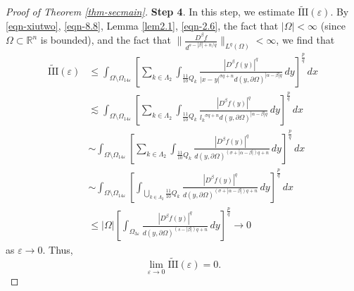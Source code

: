 \documentclass[11pt,twoside]{article}
\def\Qk{\frac{11}{10}Q_k}
\def\az{\alpha}
\def\bz{\beta}
\def\boz{{\Omega}}
\def\sz{\sigma}
\def\vez{\varepsilon}
\def\pa{\partial}                %
\def\huae{\varepsilon}
\def\bozthreee{\boz_{3\huae}}
\theoremstyle{mylem}
\theoremstyle{definition}
\numberwithin{equation}{section}
\begin{document}
\begin{proof}[Proof of Theorem \ref{thm-secmain}]
{\bf Step 4}. In this step, we estimate \(\tilde{\mathrm{III}}(\vez)\). By \eqref{eqn-xiutwo}, \eqref{eqn-8.8}, Lemma \ref{lem2.1}, \eqref{eqn-2.6},
the fact that $|\Omega|<\infty$ (since $\Omega\subset\mathbb{R}^n$ is bounded),
and the fact
that $\|\frac{D^\beta f}{d^{s-|\beta|+n/q}}\|_{L^q(\Omega)}<\infty$, we find that
\begin{align*}
\tilde{\mathrm{III}}(\vez) &\leq\int_{\Omega \setminus \Omega_{14\varepsilon}} \left[ \sum_{k\in\Lambda_2}\int_{ \Qk} \frac{| D^{\bz} f(y)|^q}{|x - y|^{\sz q + n}d(y,\pa\boz)^{|\az-\bz|q}}\,dy \right]^{\frac{p}{q}}\,dx \\
&\lesssim \int_{\Omega \setminus \Omega_{14\varepsilon}} \left[ \sum_{k\in\Lambda_2}\int_{ \Qk} \frac{|D^\bz f(y)|^q}{{l_k}^{\sz q + n}d(y,\pa\boz)^{|\az-\bz|q}}\,dy \right]^{\frac{p}{q}}\,dx \\
&\sim \int_{\Omega \setminus \Omega_{14\varepsilon}} \left[ \sum_{k\in\Lambda_2}\int_{ \Qk} \frac{|D^\bz f(y)|^q}{d(y,\pa\boz)^{(\sz+|\az-\bz|)q+n}}\,dy \right]^{\frac{p}{q}} \,dx \\
&\sim \int_{\Omega \setminus \Omega_{14\varepsilon}} \left[ \int_{\bigcup_{k \in \Lambda_2} \Qk} \frac{|D^\bz f(y)|^q}{d(y,\pa\boz)^{(\sz+|\az-\bz|)q+n}}\,dy \right]^{\frac{p}{q}} \,dx \\
&\leq |\boz|\left[ \int_{\bozthreee} \frac{|D^\bz f(y)|^q}{d(y,\pa\boz)^{(s-|\bz|)q+n}}\,dy \right]^{\frac{p}{q}} \to 0
\end{align*}
as $\varepsilon \to 0.$ Thus,
\begin{equation}\label{eqn-4.26}
\lim_{\varepsilon \to 0}\tilde{\mathrm{III}}(\vez)= 0. 
\end{equation}


\end{proof}
\end{document}
